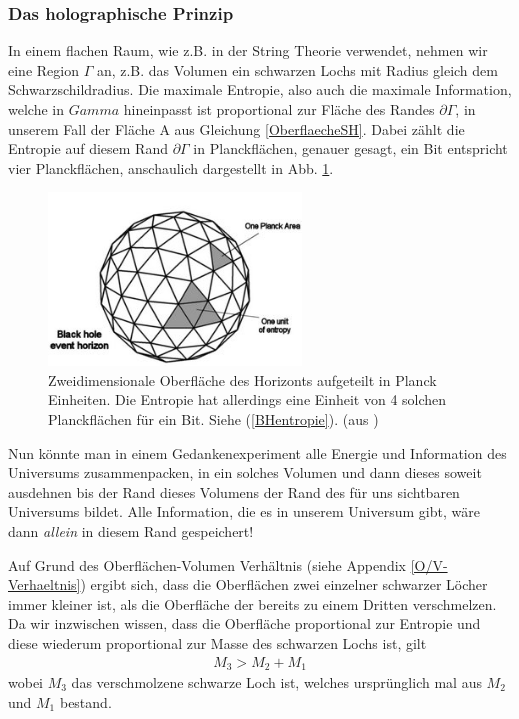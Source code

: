 \documentclass[ngerman]{scrartcl}
\begin{document}
\subsubsection*{Das holographische Prinzip}
	In einem flachen Raum, wie z.B. in der String Theorie verwendet, nehmen wir eine Region $\Gamma$ an, z.B. das Volumen ein schwarzen Lochs mit Radius gleich dem Schwarzschildradius. 
	Die maximale Entropie, also auch die maximale Information, welche in $Gamma$ hineinpasst ist proportional zur Fläche des Randes $\partial \Gamma$, in unserem Fall der Fläche A aus Gleichung \eqref{OberflaecheSH}.
	Dabei zählt die Entropie auf diesem Rand $\partial \Gamma$ in Planckflächen, genauer gesagt, ein Bit entspricht vier Planckflächen, anschaulich dargestellt in Abb. \ref{holoPrinzip}.
	\begin{figure} [h] 
		\begin{center}
			\includegraphics[width=0.6\textwidth]{BHentropy1}
		\end{center}
		\caption{Zweidimensionale Oberfläche des Horizonts aufgeteilt in Planck Einheiten. Die Entropie hat allerdings eine Einheit von 4 solchen Planckflächen für ein Bit. Siehe (\ref{BHentropie}). (aus \cite{BekensteinHawking})} \label{holoPrinzip}
	\end{figure} 
	
	Nun könnte man in einem Gedankenexperiment alle Energie und Information des Universums zusammenpacken, in ein solches Volumen und dann dieses soweit ausdehnen bis der Rand dieses Volumens der Rand des für uns sichtbaren Universums bildet. Alle Information, die es in unserem Universum gibt, wäre dann \textit{allein} in diesem Rand gespeichert!
	
	Auf Grund des Oberflächen-Volumen Verhältnis (siehe Appendix \ref{O/V-Verhaeltnis}) ergibt sich, dass die Oberflächen zwei einzelner schwarzer Löcher immer kleiner ist, als die Oberfläche der bereits zu einem Dritten verschmelzen. Da wir inzwischen wissen, dass die Oberfläche proportional zur Entropie und diese wiederum proportional zur Masse des schwarzen Lochs ist, gilt 
		\begin{align}
			M_3 > M_2 + M_1
		\end{align} 
	wobei $M_3$ das verschmolzene schwarze Loch ist, welches ursprünglich mal aus $M_2$ und $M_1$ bestand. 
\end{document}
